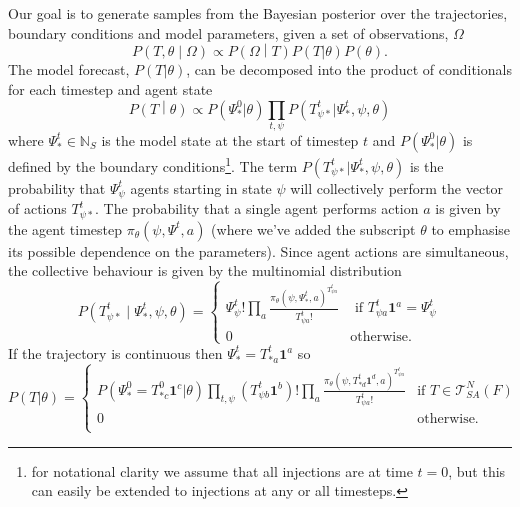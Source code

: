 \documentclass{article}
\begin{document}
Our goal is to generate samples from the Bayesian posterior over the trajectories, boundary conditions and model parameters, given a set of observations, $\Omega$
\[
P\left(T,\theta \middle| \Omega\right) \propto P\left(\Omega \middle| T\right)P(T|\theta)P(\theta).
\]
The model forecast, $P(T|\theta)$, can be decomposed into the product of conditionals for each timestep and agent state
\[
P\left(T \middle| \theta \right) \propto  P(\Psi^0_*|\theta) \prod_{t,\psi} P(T^t_{\psi *} | \Psi^t_*,\psi,\theta)
\]
where $\Psi^t_* \in\mathbb{N}_S$ is the model state at the start of timestep $t$ and $P(\Psi^0_*|\theta)$ is defined by the boundary conditions\footnote{for notational clarity we assume that all injections are at time $t=0$, but this can easily be extended to injections at any or all timesteps.}.  The term $P(T^t_{\psi *} | \Psi^t_*,\psi,\theta)$ is the probability that $\Psi^t_\psi$ agents starting in state $\psi$ will collectively perform the vector of actions $T^t_{\psi *}$. The probability that a single agent performs action $a$ is given by the agent timestep $\pi_\theta(\psi,\Psi^t,a)$ (where we've added the subscript $\theta$ to emphasise its possible dependence on the parameters). Since agent actions are simultaneous, the collective behaviour is given by the multinomial distribution
\begin{equation}
P\left(T^t_{\psi *} \mid \Psi^t_*, \psi, \theta\right) = 
\begin{cases}
\Psi^t_\psi!\prod_a \frac{\pi_\theta(\psi,\Psi^t_*,a)^{T^t_{\psi a}}}{T^t_{\psi a}!} & \text{ if } T^t_{\psi a}\mathbf{1}^a = \Psi^t_\psi \\
0 & \text{otherwise.}
\end{cases}
\end{equation}
If the trajectory is continuous then $\Psi^t_* = T^t_{* a}\mathbf{1}^a$ so 
\begin{equation}
P(T|\theta) =
\begin{cases}
P(\Psi^0_* = T^0_{* c}\mathbf{1}^c|\theta)
\prod_{t, \psi} \left(T^t_{\psi b} \mathbf{1}^b \right)!
\prod_{a} \frac{\pi_\theta(\psi, T^{t}_{* d}\mathbf{1}^d,a)^{T^{t}_{\psi a}}}{T^{t}_{\psi a}!} & \text{if } T \in \mathcal{T}^N_{SA}(F) \\
0 & \text{otherwise.}\\
\end{cases}
\label{priorTrajectory}
\end{equation}
\end{document}
